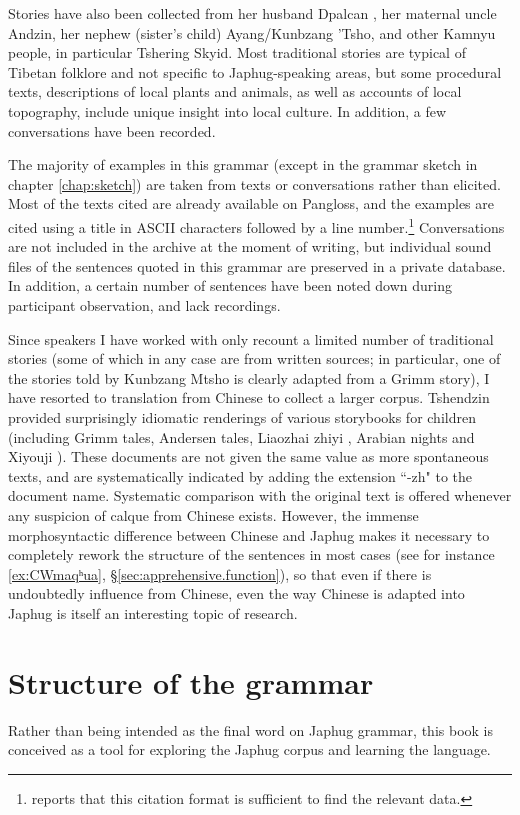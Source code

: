 Stories  have also been collected from her husband  Dpalcan , her maternal uncle Andzin, her nephew (sister's child) Ayang/Kunbzang 'Tsho, and other Kamnyu people, in particular  Tshering Skyid. Most traditional stories are typical of Tibetan folklore and not specific to Japhug-speaking areas, but some procedural texts, descriptions of local plants and animals, as well as accounts of local topography, include unique insight into local culture. In addition, a few conversations have been recorded.
 
The majority of examples in this grammar (except in the grammar sketch in chapter \ref{chap:sketch}) are taken from texts or conversations rather than elicited. Most of the texts cited are already available on Pangloss, and the examples are cited using a title in ASCII characters followed by a line number.\footnote{ \citet[305]{hill17statest} reports that this citation format is sufficient to find the relevant data. } Conversations are not included in the archive at the moment of writing, but individual sound files of the sentences quoted in this grammar are preserved in a private database. In addition, a certain number of sentences have been noted down during participant observation, and lack recordings.
 
Since speakers I have worked with only recount a limited number of traditional stories (some of which in any case are from written sources; in particular, one of the stories told by Kunbzang Mtsho is clearly adapted from a Grimm story), I have resorted to translation from Chinese to collect a larger corpus. Tshendzin provided surprisingly idiomatic renderings of various storybooks for children (including Grimm tales, Andersen tales, Liaozhai zhiyi , Arabian nights and Xiyouji ). These documents are not given the same value as more spontaneous texts, and are systematically indicated  by adding the extension ``-zh" to the document name. Systematic comparison with the original text is offered whenever any suspicion of calque from Chinese exists. However, the immense morphosyntactic difference between Chinese and Japhug makes it necessary to completely rework the structure of the sentences in most cases (see for instance \ref{ex:CWmaqʰua}, §\ref{sec:apprehensive.function}), so that even if there is undoubtedly influence from Chinese, even the way Chinese is adapted into Japhug is itself an interesting topic of research.



\section{Structure of the grammar}
Rather than being intended as the final word on Japhug grammar, this book is conceived as a tool for exploring  the Japhug corpus and learning the language. 

